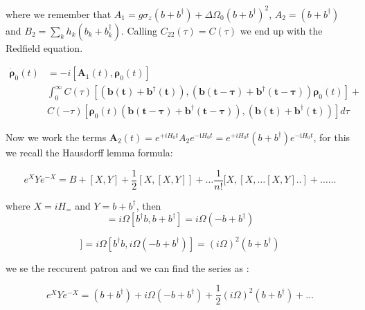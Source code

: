 \documentclass[%
preprint,
onecolumn,
notitlepag,
 amsmath,amssymb,
 aps,
 pra,
]{revtex4-2}
\begin{document}
where we remember that $A_1= g \sigma_z  \left( b + b ^{\dagger} \right) +  \Delta \Omega_0 \left( b + b ^{\dagger} \right)^2 $, $A_2= \left( b + b ^{\dagger} \right) $ and $B_2= \sum_k h_k \left( b_k + b_k ^{\dagger} \right)$. Calling $C_{22}(\tau)=C(\tau)$ we end up with the Redfield equation. 


\begin{equation}\begin{align}
\dot{\boldsymbol{\rho}}_0(t) &= -i \left[ \boldsymbol{A}_1(t) , \boldsymbol{\rho}_0(t) \right] \\
&\int_{0}^{\infty} C(\tau)\left[\boldsymbol{\left( b(t) + b ^{\dagger}(t) \right)}, \left( \boldsymbol{ b(t-\tau) + b ^{\dagger} (t-\tau) }\right) \boldsymbol{\rho}_{\mathrm{0}}(t)\right]+ \\
&C(-\tau)\left[\boldsymbol{\rho}_{\mathrm{0}}(t) \left( \boldsymbol{ b(t-\tau) + b ^{\dagger} (t-\tau) } \right), \boldsymbol{\left( b(t) + b ^{\dagger}(t) \right)}\right] d \tau 
\end{align}
\end{equation}



Now we work the terms $\boldsymbol{A}_2(t) = e^{+i H_{0} t} A_2 e^{-\mathrm{i} H_{0} t} = e^{+i H_{0} t} (b+b^{\dagger}) e^{-\mathrm{i} H_{0} t} $, for this we recall the Hausdorff lemma formula:


\begin{equation}
\left.e^{X} Y e^{-X}=B+[X, Y]+\frac{1}{2}[X,[X, Y]]+\ldots \frac{1}{n !}[X,[X, \ldots[X, Y] . .]+\ldots \ldots
\end{equation}

where $X= i H_=$ and $Y= b+b^{\dagger} $, then 
\begin{equation}
[X, Y] = i \Omega [ b^{\dagger}b , b+b^{\dagger}  ] = i \Omega  \left( -b+b^{\dagger}  \right)  
\end{equation}

\begin{equation}
[X,[X, Y]]= i \Omega [ b^{\dagger}b , i \Omega  \left( -b+b^{\dagger}  \right)  ] = (i \Omega) ^2   \left( b+b^{\dagger}  \right) 
\end{equation}

we se the reccurent patron and we can find the series as :

\begin{equation}
\left.e^{X} Y e^{-X}= \left(b+b^{\dagger} \right) +i \Omega  \left( -b+b^{\dagger}  \right)  +\frac{1}{2}(i \Omega) ^2   \left( b+b^{\dagger}  \right) +\ldots 
\end{equation}
\end{document}
